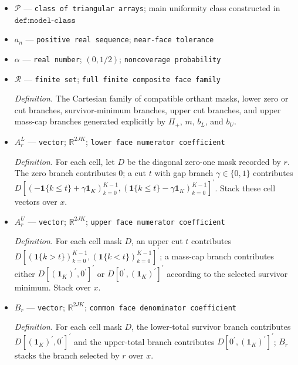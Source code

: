 \documentclass{article}
\begin{document}
\begin{itemize}
  \par\smallskip\noindent\emph{Definition.} The covariance of the influence vector for the stacked conditional contrasts \((\ell_{n,x,k},h_{n,x,k})_{x,k}\) under total-sample \(\sqrt n\) scaling.
  \item \(\mathcal P\) --- \texttt{class of triangular arrays}; main uniformity class constructed in \(\texttt{def:model-class}\)
  \item \(a_n\) --- \texttt{positive real sequence}; \texttt{near-\allowbreak{}face tolerance}
  \item \(\alpha\) --- \texttt{real number}; \((0,1/2)\); \texttt{noncoverage probability}
  \item \(\mathcal R\) --- \texttt{finite set}; \texttt{full finite composite face family}
  \par\smallskip\noindent\emph{Definition.} The Cartesian family of compatible orthant masks, lower zero or cut branches, survivor-minimum branches, upper cut branches, and upper mass-cap branches generated explicitly by \(\Pi_+\), \(m\), \(b_L\), and \(b_U\).
  \item \(A^L_r\) --- \texttt{vector}; \(\mathbb R^{2JK}\); \texttt{lower face numerator coefficient}
  \par\smallskip\noindent\emph{Definition.} For each cell, let \(D\) be the diagonal zero-one mask recorded by \(r\). The zero branch contributes \(0\); a cut \(t\) with gap branch \(\gamma\in\{0,1\}\) contributes \(D[(-\mathbf 1\{k\le t\}+\gamma\mathbf 1_K)_{k=0}^{K-1},(\mathbf 1\{k\le t\}-\gamma\mathbf 1_K)_{k=0}^{K-1}]^{\prime}\). Stack these cell vectors over \(x\).
  \item \(A^U_r\) --- \texttt{vector}; \(\mathbb R^{2JK}\); \texttt{upper face numerator coefficient}
  \par\smallskip\noindent\emph{Definition.} For each cell mask \(D\), an upper cut \(t\) contributes \(D[(\mathbf 1\{k>t\})_{k=0}^{K-1},(\mathbf 1\{k<t\})_{k=0}^{K-1}]^{\prime}\); a mass-cap branch contributes either \(D[(\mathbf 1_K)^{\prime},0^{\prime}]^{\prime}\) or \(D[0^{\prime},(\mathbf 1_K)^{\prime}]^{\prime}\) according to the selected survivor minimum. Stack over \(x\).
  \item \(B_r\) --- \texttt{vector}; \(\mathbb R^{2JK}\); \texttt{common face denominator coefficient}
  \par\smallskip\noindent\emph{Definition.} For each cell mask \(D\), the lower-total survivor branch contributes \(D[(\mathbf 1_K)^{\prime},0^{\prime}]^{\prime}\) and the upper-total branch contributes \(D[0^{\prime},(\mathbf 1_K)^{\prime}]^{\prime}\); \(B_r\) stacks the branch selected by \(r\) over \(x\).

\end{itemize}
\end{document}
